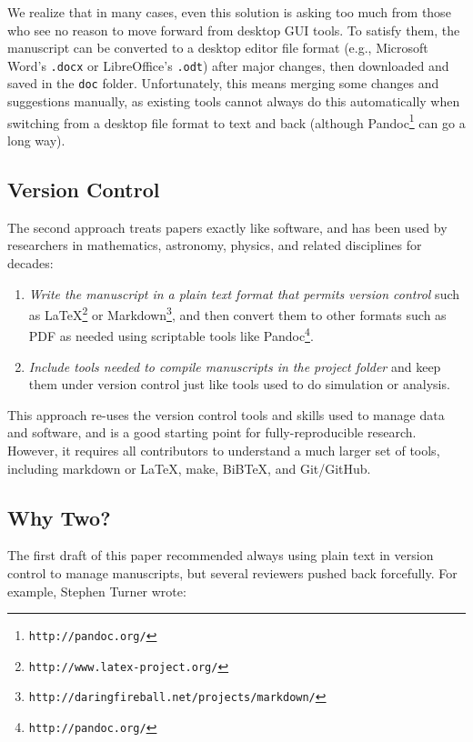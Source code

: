 \documentclass[10pt]{article}
\newcommand{\recommend}[1]{\textit{#1}}
\newcommand{\withurl}[2]{{#1}\footnote{\texttt{#2}}}
\begin{document}
We realize that in many cases, even this solution is asking too much
from those who see no reason to move forward from desktop GUI
tools. To satisfy them, the manuscript can be converted to a desktop
editor file format (e.g., Microsoft Word's \texttt{.docx} or
LibreOffice's \texttt{.odt}) after major changes, then downloaded and
saved in the \texttt{doc} folder. Unfortunately, this means merging
some changes and suggestions manually, as existing tools cannot always
do this automatically when switching from a desktop file format to
text and back (although \withurl{Pandoc}{http://pandoc.org/} can go a
long way).

\subsection*{Version Control}

The second approach treats papers exactly like software, and has been
used by researchers in mathematics, astronomy, physics, and related
disciplines for decades:

\begin{enumerate}

\item
  \recommend{Write the manuscript in a plain text format that permits
    version control} such as
  \withurl{LaTeX}{http://www.latex-project.org/} or
  \withurl{Markdown}{http://daringfireball.net/projects/markdown/},
  and then convert them to other formats such as PDF as needed using
  scriptable tools like \withurl{Pandoc}{http://pandoc.org/}.

\item
  \recommend{Include tools needed to compile manuscripts in the
    project folder} and keep them under version control just like
  tools used to do simulation or analysis.

\end{enumerate}

This approach re-uses the version control tools and skills used to
manage data and software, and is a good starting point for
fully-reproducible research. However, it requires all contributors to
understand a much larger set of tools, including markdown or LaTeX,
make, BiBTeX, and Git/GitHub.

\subsection*{Why Two?}

The first draft of this paper recommended always using plain text in
version control to manage manuscripts, but several reviewers pushed
back forcefully. For example, Stephen Turner wrote:
\end{document}
